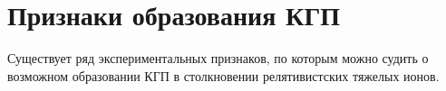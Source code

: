 \begin{comment}
	Количественно феноменологическая гидродинамическая модель, предложенная Schnedermann et. др. [13] можно применить к спектрам одиночных частиц для извлечения поперечной скорости и температуры при замораживании. В этой модели, называемой моделью «взрывной волны», эффекты коллективного расширения включаются в спектры поперечных масс следующим образом:
	
	\begin{linenomath}
		\begin{equation}
			\frac{d \sigma}{m_T dm_T} \sim \int_0^R r dr \cdot m_T 
			I_0 \left(\frac{p_T sinh(\rho)}{T_{fo}}\right) K_1 \left(\frac{m_T cosh(\rho)}{T_{fo}} \right)
		\end{equation}
	\end{linenomath}
	где $I_0$ и $K_1$ представляют собой модифицированные функции Бесселя, где $\rho$ представляет собой поперечное усиление, которое зависит от радиального положения в соответствии с $\rho = tanh^{-1} \beta_r(r)$. Детали этого выражения описаны в Приложении A.2. Здесь $T_{fo}$ - температура замерзания, $R$ - максимальный радиус расширяющегося источника при замораживании. Профиль поперечной скорости $\beta_r(r)$ параметризуется как $\beta_r(r) = \beta_T(r/R)^n$ с поверхностной скоростью $\beta_T$. Мы можем варьировать форму профиля скорости с индексом $n$, например, $n = 0,5,1,2$. Средняя поперечная скорость определяется как
	\begin{linenomath}
		\begin{equation}
			\left< \beta_T \right> = \frac{\int_0^R \beta_r(r)r dr}{\int_0^R r dr} = \left(\frac{2}{2+n} \right)\beta_T
		\end{equation}
	\end{linenomath}
	По результатам подгонки средняя поперечная скорость не зависит от профиля скорости [14]. На рис. 1,8 показаны результаты подгонки гидродинамической моделью течения при центральных столкновениях Pb + Pb и S+S в области средней скорости [11]. Сплошные линии — спектры источника с $T_{fo}$ = 140 МэВ и $\beta_T$ = 0,6 ($\left< \beta_T \right>$ = 0,4) для Pb+Pb и источника с $T_{fo}$ = 140 МэВ и $\beta_T$ = 0,41 ($\left< \beta_T \right>$ = 0,27) для S+S. Как показано на рис. 1,8, все спектры частиц от пионов до протонов очень хорошо воспроизводятся с двумя параметрами, $T_{fo}$ и $\beta_T$.
\end{comment}



\section{Признаки образования КГП} \label{subsec:ch1/sec1_1}
Существует ряд экспериментальных признаков, по которым можно судить о возможном образовании КГП в столкновении релятивистских тяжелых ионов. 

